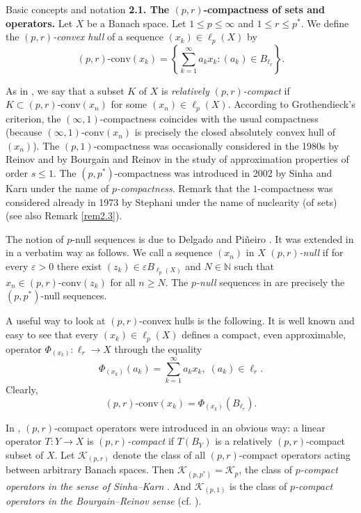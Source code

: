 \documentclass[a4paper,11pt]{amsart}
\theoremstyle{definition}
\theoremstyle{definition}
\theoremstyle{definition}
\begin{document}
\begin{section}{Basic concepts and notation}
{\bf 2.1. The ${{(p,r)}}$-compactness of sets and operators.} Let $X$ be a Banach space. Let $1\leq p \leq \infty$ and $1\leq r \leq {p^{\ast}}$. We define the \emph{$(p,r)$-convex hull} of a sequence $(x_k)\in \ell_p(X)$ by 
\[
(p,r) \mbox{-conv}(x_k)=\left\{ \sum_{k=1}^\infty a_k x_k : (a_k)\in B_{\ell_r} \right\}.
\]

As in \cite{ALO}, we say that a subset $K$ of $X$ is \emph{relatively $(p,r)$-compact} if $K\subset (p,r)\mbox{-conv}(x_n)$ for some $(x_n)\in \ell_p(X)$. According to Grothendieck's criterion, the $(\infty, 1)$-compactness coincides with the usual compactness (because $(\infty, 1)\mbox{-conv}(x_n)$ is precisely the closed absolutely convex hull of $(x_n)$). The $(p,1)$-compactness was occasionally considered in the 1980s by Reinov \cite{R1984} and by Bourgain and Reinov \cite{BR} in the study of approximation properties of order $s\leq 1$. The $(p, {p^{\ast}})$-compactness was introduced in 2002 by Sinha and Karn \cite{SK1} under the name of \emph{$p$-compactness}. Remark that the $1$-compactness was considered already in 1973 by Stephani \cite[Section~4]{S73} under the name of nuclearity (of sets) (see also Remark \ref{rem2.3}).

The notion of $p$-null sequences is due to Delgado and Pi\~neiro \cite{PD}. It was extended in \cite{AO1} in a verbatim way as follows. We call a sequence $(x_n)$ in $X$ \emph{$(p,r)$-null} if for every ${\varepsilon} > 0$ there exist $(z_k)\in{\varepsilon} B_{\ell_p(X)}$ and  $N\in \mathbb N$ such that $x_n \in (p,r)\mbox{-conv}(z_k)$ for all $n \geq N$. The \emph{$p$-null} sequences in \cite{PD} are precisely the $(p,{p^{\ast}})$-null sequences.

A useful way  to look at $(p,r)$-convex hulls is the following. It is well known and easy to see that every $(x_k)\in \ell_p(X)$ defines a compact, even approximable, operator $\Phi _{(x_k)}: \ell_r {\rightarrow} X$ through the equality
\[
\Phi _{(x_k)}(a_k)= \sum _{k=1}^\infty a_k x_k, \; (a_k) \in \ell _r.
\]
Clearly,
\[
(p,r)\mbox{-conv}(x_k)= \Phi_{(x_k)}(B_{\ell_r}).
\]

In \cite{ALO}, ${{(p,r)}}$-compact operators were introduced in an obvious way: a linear operator $T: Y {\rightarrow} X $ is {\it $(p,r)$-compact} if $T(B_Y)$ is a relatively $(p,r)$-compact subset of $X$. 
Let ${{\mathcal K}}_{(p,r)}$ denote the class of all $(p,r)$-compact operators acting between arbitrary Banach spaces. Then ${{\mathcal K}}_{(p, {p^{\ast}})}= {{\mathcal K}}_p$, the class of \emph{$p$-compact operators in the sense of Sinha--Karn} \cite{SK1}. And ${{\mathcal K}}_{(p,1)}$ is the class of  \emph{$p$-compact operators in the Bourgain--Reinov sense} (cf. \cite{BR, R1984}).


\end{section}
\end{document}
